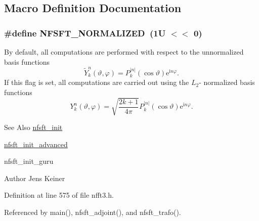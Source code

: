 \subsection{Macro Definition Documentation}
\hypertarget{group__nfsft_ga65036f479a7421863956c02aa78bc9be}{
\subsubsection[{N\-F\-S\-F\-T\-\_\-\-N\-O\-R\-M\-A\-L\-I\-Z\-E\-D}]{\setlength{\rightskip}{0pt plus 5cm}\#define N\-F\-S\-F\-T\-\_\-\-N\-O\-R\-M\-A\-L\-I\-Z\-E\-D~(1\-U $<$$<$ 0)}}\label{group__nfsft_ga65036f479a7421863956c02aa78bc9be}
By default, all computations are performed with respect to the unnormalized basis functions \[ \tilde{Y}_k^n(\vartheta,\varphi) = P_k^{|n|}(\cos\vartheta) \mathrm{e}^{\mathrm{i} n \varphi}. \] If this flag is set, all computations are carried out using the $L_2$-\/ normalized basis functions \[ Y_k^n(\vartheta,\varphi) = \sqrt{\frac{2k+1}{4\pi}} P_k^{|n|}(\cos\vartheta) \mathrm{e}^{\mathrm{i} n \varphi}. \]

\begin{DoxySeeAlso}{See Also}
\hyperlink{group__nfsft_ga65cda3f4a3edc5eb39c697cf34b1f0b9}{nfsft\-\_\-init} 

\hyperlink{group__nfsft_ga2812aa5beba0eb7efd3072bf323a0155}{nfsft\-\_\-init\-\_\-advanced} 

nfsft\-\_\-init\-\_\-guru 
\end{DoxySeeAlso}
\begin{DoxyAuthor}{Author}
Jens Keiner 
\end{DoxyAuthor}


Definition at line 575 of file nfft3.\-h.



Referenced by main(), nfsft\-\_\-adjoint(), and nfsft\-\_\-trafo().

